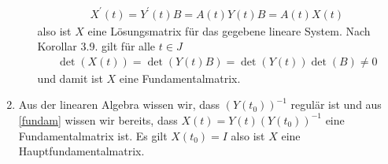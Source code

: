 \begin{solution}
\begin{enumerate}[label = \alph*)]
\begin{enumerate}
            \begin{align*}
                X^\prime(t) = Y^\prime(t) B = A(t) Y(t) B = A(t) X(t)
            \end{align*}  
            also ist $X$ eine Lösungsmatrix für das gegebene lineare System. Nach Korollar 3.9. gilt für alle $t \in J$
            \begin{align*}
                \det(X(t)) = \det(Y(t)B) = \det(Y(t)) \det(B) \neq 0
            \end{align*}
            und damit ist $X$ eine Fundamentalmatrix.
        \end{enumerate}
        \item Aus der linearen Algebra wissen wir, dass $(Y(t_0))^{-1}$ regulär ist und aus \ref{fundam} wissen wir bereits, dass $X(t) = Y(t) (Y(t_0))^{-1}$ eine Fundamentalmatrix ist. Es gilt $X(t_0) = I$ also ist $X$ eine Hauptfundamentalmatrix.
    \end{enumerate}
\end{solution}